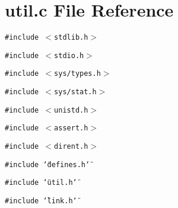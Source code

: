 \section{util.c File Reference}
\label{util_8c}
{\tt \#include $<$stdlib.h$>$}\par
{\tt \#include $<$stdio.h$>$}\par
{\tt \#include $<$sys/types.h$>$}\par
{\tt \#include $<$sys/stat.h$>$}\par
{\tt \#include $<$unistd.h$>$}\par
{\tt \#include $<$assert.h$>$}\par
{\tt \#include $<$dirent.h$>$}\par
{\tt \#include \char`\"{}defines.h\char`\"{}}\par
{\tt \#include \char`\"{}util.h\char`\"{}}\par
{\tt \#include \char`\"{}link.h\char`\"{}}\par
